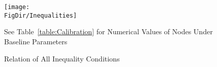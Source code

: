 \begin{figure}[ht]
  \centerline{
    \texttt{[image: \\FigDir/Inequalities]}
  }
  \caption{Relation of All Inequality Conditions} \label{fig:Inequalities}
\centerline{See Table~\ref{table:Calibration} for Numerical Values of Nodes Under Baseline Parameters}
\end{figure}
